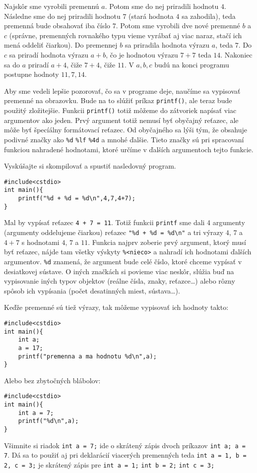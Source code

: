 Najskôr sme vyrobili premennú $a$. Potom sme do nej priradili hodnotu $4$.
Následne sme do nej priradili hodnotu $7$ (stará hodnota $4$ sa zahodila), teda
premenná bude obsahovať iba číslo $7$. Potom sme vyrobili dve nové premenné $b$
a $c$ (správne, premenných rovnakého typu vieme vyrábať aj viac naraz, stačí
ich mená oddeliť čiarkou).  Do premennej $b$ sa priradila hodnota výrazu $a$,
teda $7$. Do $c$ sa priradí hodnota výrazu $a + b$, čo je hodnotou výrazu $7 +
7$ teda $14$. Nakoniec sa do $a$ priradí $a + 4$, čiže $7+4$, čiže $11$. V
$a,b,c$ budú na konci programu postupne hodnoty $11,7,14$.

\medskip

Aby sme vedeli lepšie pozorovať, čo sa v programe deje, naučíme sa vypisovať
premenné na obrazovku. Bude na to slúžiť príkaz \verb!printf()!, ale teraz bude
použitý zložitejšie. Funkcii \verb!printf()! totiž môžeme do zátvoriek napísať
viac argumentov ako jeden.  Prvý argument totiž nemusí byť obyčajný reťazec,
ale môže byť špecíálny formátovací reťazec. Od obyčajného sa lýši tým, že
obsahuje podivné značky ako \verb!%d! \verb!%lf! \verb!%4d! a mnohé ďalšie.
Tieto značky sú pri spracovaní funkciou nahradené hodnotami, ktoré určíme v
ďalších argumentoch tejto funkcie.

Vyskúšajte si skompilovať a spustiť nasledovný program.
\begin{lstlisting}
#include<cstdio>
int main(){
    printf("%d + %d = %d\n",4,7,4+7);
}
\end{lstlisting}
Mal by vypísať reťazec \verb!4 + 7 = 11!. Totiž funkcii \verb!printf! sme dali
4 argumenty (argumenty oddelujeme čiarkou) reťazec \verb!"%d + %d = %d\n"! a
tri výrazy $4$, $7$ a $4+7$ s hodnotami $4$, $7$ a $11$.  Funkcia najprv
zoberie prvý argument, ktorý musí byť reťazec, nájde tam všetky výskyty
\verb!%<nieco>! a nahradí ich hodnotami ďalších argumentov.  \verb!%d! znamená,
že argument bude celé číslo, ktoré chceme vypísať v desiatkovej sústave. O
iných značkách si povieme viac neskôr, slúžia buď na vypisovanie iných typov
objektov (reálne čísla, znaky, reťazce\dots) alebo rôzny spôsob ich vypísania
(počet desatinných miest, sústava\dots).

Keďže premenné sú tiež výrazy, tak môžeme vypisovať ich hodnoty takto:
\begin{lstlisting}
#include<cstdio>
int main(){
    int a;
    a = 17;
    printf("premenna a ma hodnotu %d\n",a);
}
\end{lstlisting}
Alebo bez zbytočných blábolov:
\begin{lstlisting}
#include<cstdio>
int main(){
    int a = 7;
    printf("%d\n",a);
}
\end{lstlisting}
Všimnite si riadok \verb!int a = 7;! ide o skrátený zápis dvoch príkazov
\verb!int a; a = 7!. Dá sa to použiť aj pri deklarácií viacerých premenných
teda \verb!int a = 1, b = 2, c = 3;! je skrátený zápis pre \verb!int a = 1;!
\verb!int b = 2;! \verb!int c = 3;!


